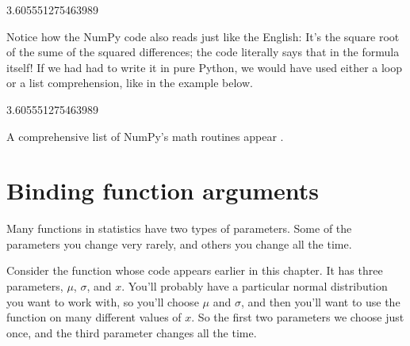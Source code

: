 \documentclass[letterpaper,10pt,english]{sphinxmanual}
\begin{document}
\begin{sphinxVerbatim}[commandchars=\\\{\}]
3.605551275463989
\end{sphinxVerbatim}

Notice how the NumPy code also reads just like the English:  It’s the square root of the sume of the squared differences; the code literally says that in the formula itself!  If we had had to write it in pure Python, we would have used either a loop or a list comprehension, like in the example below.

\begin{sphinxVerbatim}[commandchars=\\\{\}]
    \PYG{p}{[}  \PYG{p}{[}\PYG{p}{]}  \PYG{p}{[}\PYG{p}{]}      \PYG{p}{]}   
\end{sphinxVerbatim}

\begin{sphinxVerbatim}[commandchars=\\\{\}]
3.605551275463989
\end{sphinxVerbatim}

A comprehensive list of NumPy’s math routines appear .


\section{Binding function arguments}
\label{\detokenize{chapter-9-math-and-stats:binding-function-arguments}}
Many functions in statistics have two types of parameters.  Some of the parameters you change very rarely, and others you change all the time.

  Consider the  function whose code appears earlier in this chapter.  It has three parameters, \(\mu\), \(\sigma\), and \(x\).  You’ll probably have a particular normal distribution you want to work with, so you’ll choose \(\mu\) and \(\sigma\), and then you’ll want to use the function on many different values of \(x\).  So the first two parameters we choose just once, and the third parameter changes all the time.
\end{document}
